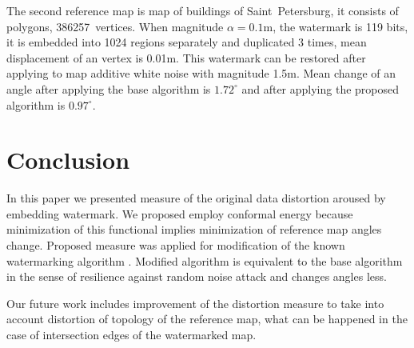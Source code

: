 \documentclass{article}
\begin{document}
The second reference map is map of buildings of Saint~Petersburg, it consists of polygons, 386257~vertices. When magnitude $\alpha = 0.1$m, the watermark is 119 bits, it is embedded into 1024 regions separately 
and duplicated 3 times, mean displacement of an vertex is 0.01m. This watermark can be restored after applying to map additive white noise with magnitude 1.5m. 
Mean change of an angle after applying the base algorithm is $1.72^\circ$ and after applying the proposed algorithm is $0.97^\circ$.  

\section{Conclusion}
\label{sec:conclusion}
In this paper we presented measure of the original data distortion aroused by embedding watermark. We proposed employ conformal energy because minimization of this functional implies 
minimization of reference map angles change. Proposed measure was applied for modification of the known watermarking algorithm \cite{Ohbuchi}. Modified algorithm is equivalent to the base algorithm in the sense of 
resilience against random noise attack and changes angles less.

Our future work includes improvement of the distortion measure to take into account distortion of topology of the reference map, what can be happened in the case of intersection edges of the watermarked map.



\end{document}
